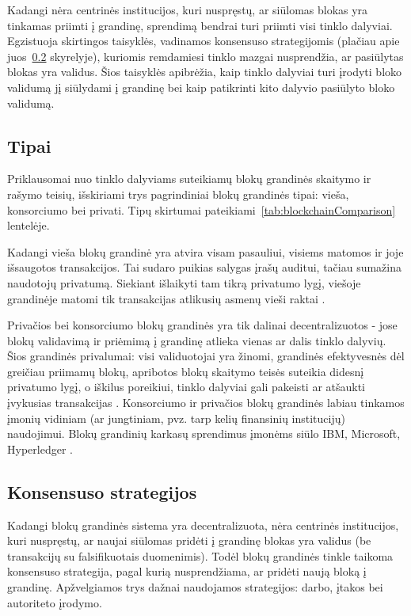 Kadangi nėra centrinės institucijos, kuri nuspręstų, ar siūlomas blokas yra tinkamas priimti į grandinę, sprendimą bendrai turi priimti
visi tinklo dalyviai. Egzistuoja skirtingos taisyklės, vadinamos konsensuso strategijomis (plačiau apie juos~\ref{blockchain:consensus} skyrelyje), kuriomis
remdamiesi tinklo mazgai nusprendžia, ar pasiūlytas blokas yra validus. Šios taisyklės apibrėžia, kaip tinklo dalyviai turi įrodyti bloko validumą jį siūlydami į grandinę
bei kaip patikrinti kito dalyvio pasiūlyto bloko validumą.

\subsection{Tipai}

Priklausomai nuo tinklo dalyviams suteikiamų blokų grandinės skaitymo ir rašymo teisių,
išskiriami trys pagrindiniai blokų grandinės tipai: vieša, konsorciumo bei privati.  Tipų skirtumai pateikiami~\ref{tab:blockchainComparison} lentelėje.



Kadangi vieša blokų grandinė yra atvira visam pasauliui, visiems matomos ir joje išsaugotos transakcijos. Tai sudaro puikias salygas įrašų
auditui, tačiau sumažina naudotojų privatumą. Siekiant išlaikyti tam tikrą privatumo lygį, viešoje grandinėje matomi tik transakcijas atlikusių 
asmenų vieši raktai \cite{SatoshiNakamoto}.

Privačios bei konsorciumo blokų grandinės yra tik dalinai decentralizuotos - jose blokų validavimą ir priėmimą į grandinę atlieka vienas
ar dalis tinklo dalyvių. Šios grandinės privalumai: visi validuotojai yra žinomi, grandinės efektyvesnės dėl greičiau priimamų blokų, apribotos blokų skaitymo teisės suteikia didesnį
privatumo lygį, o iškilus poreikiui, tinklo dalyviai gali pakeisti ar atšaukti įvykusias transakcijas \cite{Buterin2015}. Konsorciumo ir privačios blokų grandinės labiau tinkamos įmonių vidiniam (ar jungtiniam,
pvz. tarp kelių finansinių institucijų) naudojimui. Blokų grandinių karkasų sprendimus įmonėms siūlo IBM, Microsoft, Hyperledger \cite{Zheng2017}.

\subsection{Konsensuso strategijos} \label{blockchain:consensus}

Kadangi blokų grandinės sistema yra decentralizuota, nėra centrinės institucijos, kuri nuspręstų, ar naujai siūlomas pridėti į grandinę blokas
yra validus (be transakcijų su falsifikuotais duomenimis). Todėl blokų grandinės tinkle taikoma konsensuso strategija,
pagal kurią nusprendžiama, ar pridėti naują bloką į grandinę. Apžvelgiamos trys dažnai naudojamos strategijos: darbo, įtakos bei autoriteto įrodymo.

